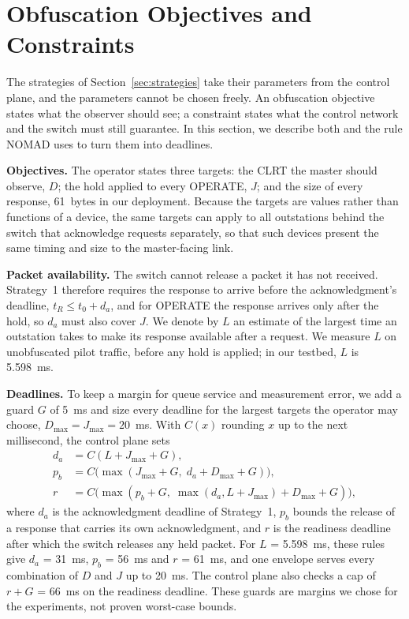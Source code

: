 \section{Obfuscation Objectives and Constraints}
\label{sec:objectives}

The strategies of Section~\ref{sec:strategies} take their parameters from the control plane, and the parameters cannot be chosen freely. An obfuscation objective states what the observer should see; a constraint states what the control network and the switch must still guarantee. In this section, we describe both and the rule NOMAD uses to turn them into deadlines.

\textbf{Objectives.} The operator states three targets: the CLRT the master should observe, $D$; the hold applied to every OPERATE, $J$; and the size of every response, 61~bytes in our deployment. Because the targets are values rather than functions of a device, the same targets can apply to all outstations behind the switch that acknowledge requests separately, so that such devices present the same timing and size to the master-facing link.

\textbf{Packet availability.} The switch cannot release a packet it has not received. Strategy~1 therefore requires the response to arrive before the acknowledgment's deadline, $t_R \leq t_0 + d_a$, and for OPERATE the response arrives only after the hold, so $d_a$ must also cover $J$. We denote by $L$ an estimate of the largest time an outstation takes to make its response available after a request. We measure $L$ on unobfuscated pilot traffic, before any hold is applied; in our testbed, $L$ is 5.598~ms.

\textbf{Deadlines.} To keep a margin for queue service and measurement error, we add a guard $G$ of 5~ms and size every deadline for the largest targets the operator may choose, $D_{\max} = J_{\max} = 20$~ms. With $C(x)$ rounding $x$ up to the next millisecond, the control plane sets
\begin{equation}
\label{eq:envelope}
\begin{aligned}
d_a &= C(L + J_{\max} + G),\\
p_b &= C\big(\max(J_{\max} + G,\; d_a + D_{\max} + G)\big),\\
r &= C\big(\max(p_b + G,\; \max(d_a, L + J_{\max}) + D_{\max} + G)\big),
\end{aligned}
\end{equation}
where $d_a$ is the acknowledgment deadline of Strategy~1, $p_b$ bounds the release of a response that carries its own acknowledgment, and $r$ is the readiness deadline after which the switch releases any held packet. For $L$ = 5.598~ms, these rules give $d_a$ = 31~ms, $p_b$ = 56~ms and $r$ = 61~ms, and one envelope serves every combination of $D$ and $J$ up to 20~ms. The control plane also checks a cap of $r + G$ = 66~ms on the readiness deadline. These guards are margins we chose for the experiments, not proven worst-case bounds.

